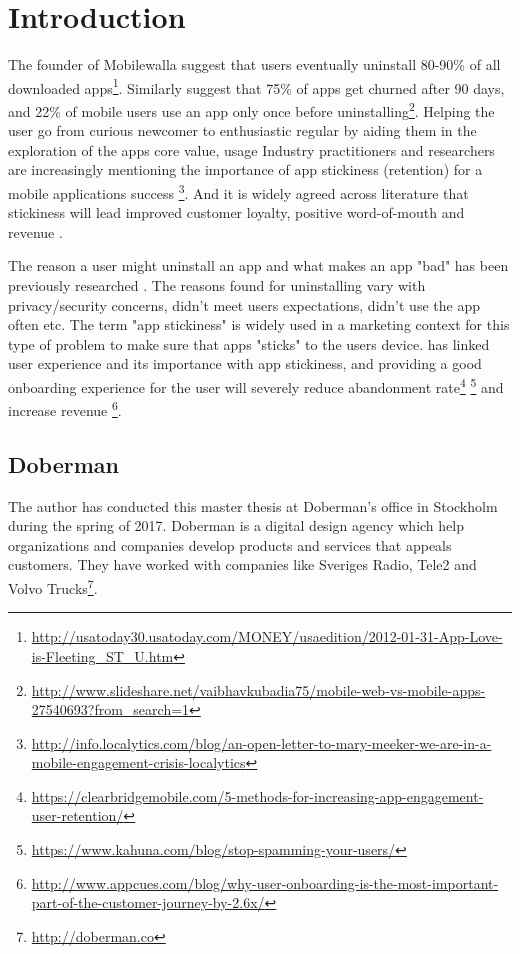\chapter{Introduction}
\label{chap:introduction}


The founder of Mobilewalla suggest that users eventually uninstall 80-90\% of all downloaded apps\footnote{\url{http://usatoday30.usatoday.com/MONEY/usaedition/2012-01-31-App-Love-is-Fleeting\_ST\_U.htm}}. Similarly \cite{Perro2016} suggest that 75\% of apps get churned after 90 days, and 22\% of mobile users use an app only once before uninstalling\footnote{\url{http://www.slideshare.net/vaibhavkubadia75/mobile-web-vs-mobile-apps-27540693?from_search=1}}. Helping the user go from curious newcomer to enthusiastic regular by aiding them in the exploration of the apps core value, usage Industry practitioners and researchers are increasingly mentioning the importance of app stickiness (retention) for a mobile applications success \cite{Perro2016} \cite{IGIGlobal2016} \cite{Kim2016}\footnote{\url{http://info.localytics.com/blog/an-open-letter-to-mary-meeker-we-are-in-a-mobile-engagement-crisis-localytics}}. And it is widely agreed across literature that stickiness will lead improved customer loyalty, positive word-of-mouth and revenue \cite{Reichheld2000} \cite{Srinivasan2002} \cite{Hsu2016a}.

The reason a user might uninstall an app and what makes an app "bad" has been previously researched \cite{Lin2012} \cite{Shklovski} \cite{Song2014}. The reasons found for uninstalling vary with privacy/security concerns, didn't meet users expectations, didn't use the app often etc. The term "app stickiness" is widely used in a marketing context for this type of problem to make sure that apps "sticks" to the users device. \cite{IGIGlobal2016} has linked user experience and its importance with app stickiness, and providing a good onboarding experience for the user will severely reduce abandonment rate\footnote{\url{https://clearbridgemobile.com/5-methods-for-increasing-app-engagement-user-retention/}} \footnote{\url{https://www.kahuna.com/blog/stop-spamming-your-users/}} and increase revenue \footnote{\url{http://www.appcues.com/blog/why-user-onboarding-is-the-most-important-part-of-the-customer-journey-by-2.6x/}}.

\section{Doberman}
The author has conducted this master thesis at Doberman's office in Stockholm during the spring of 2017. Doberman is a digital design agency which help organizations and companies develop products and services that appeals customers. They have worked with companies like Sveriges Radio, Tele2 and Volvo Trucks\footnote{\url{http://doberman.co}}.

